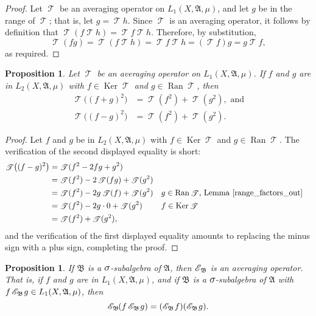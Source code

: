 \documentclass[
twoside=true,
paper=letter,
fontsize=11pt,
pagesize=auto,
leqno,
openany,
headsepline,
overfullrule,
]{scrbook}
\theoremstyle{plain}
\theoremstyle{plain}
\newtheorem{prop}[thm]{Proposition}
\theoremstyle{definition}
\theoremstyle{bfnoteitalic}
\theoremstyle{bfnoteroman}
\newcommand{\sigalg}[1]{\mathfrak{#1}}
\newcommand{\cali}[1]{\mathscr{#1}}
\DeclareMathOperator{\range}{Ran}
\DeclareMathOperator{\kernel}{Ker}
\newcommand{\condexpsub}[2]
{\mathop{\cali{E}\hspace{-1.5pt}}\nolimits_{#2}\hspace{-1pt}#1}
\newcommand{\condexpop}[1]{\mathop{\cali{E}\hspace{-1pt}}\nolimits_{#1}}
\newcommand{\textsigma}{\hbox{\large{$\sigma$}}\kern-1pt}
\newcommand{\sigmaalgebra}{\sigalg{A}}
\newcommand{\sigmaalgebraii}{\sigalg{B}}
\newcommand{\Lone}{L_1(\measurespace, \sigmaalgebra, \measure)}
\newcommand{\Ltwo}{L_2(\measurespace, \sigmaalgebra, \measure)}
\newcommand{\OpT}{\mathop{\cali T}}
\newcommand{\function}{f}
\newcommand{\functionii}{g}
\newcommand{\functioniii}{h}
\newcommand{\measurespace}{X}
\newcommand{\measure}{\mu}
\begin{document}
\begin{proof}
Let $\OpT$ be an averaging operator on $\Lone$, and let $\functionii$ be in the range of $\OpT$; that is, let $\functionii = \OpT \functioniii$. Since $\OpT$ is an averaging operator, it follows by definition that
$ \OpT(\function\OpT \functioniii) = \OpT \function \OpT \functioniii $.  Therefore, by substitution, 
\[
\OpT(\function\functionii) = \OpT(\function\OpT \functioniii) = \OpT \function \OpT \functioniii 
= (\OpT \function)\functionii = \functionii\OpT \function,
\]
as required.
\end{proof}

\begin{prop}\label{averaging_bias_variance}
Let $\OpT$ be an averaging operator on $\Lone$.
If $\function$ and $\functionii$ are in $\Ltwo$ with $\function\in\kernel\OpT$ and $\functionii\in\range \OpT$,  then 
\begin{align*}
\OpT\bigl((\function+\functionii)^2\bigr)
& =
\OpT(\function^2) + \OpT(\functionii^2), \text{ and}
\\
\OpT\bigl((\function-\functionii)^2\bigr)
& =
\OpT(\function^2) + \OpT(\functionii^2).
\end{align*}
\end{prop}

\begin{proof}
Let $\function$ and $\functionii$ be in $\Ltwo$ with $\function\in\kernel\OpT$ and $\functionii\in\range\OpT$.
The verification of the second displayed equality is short:
\begin{align*}
\OpT \bigl( (\function-\functionii)^2 \bigr)
& = \OpT(\function^2 -2\function\functionii +\functionii^2)\\
& = \OpT(\function^2) - 2\OpT(\function\functionii) + \OpT(\functionii^2)\\
& = \OpT(\function^2) - 2\functionii\OpT(\function) +\OpT(\functionii^2)
&& \text{$\functionii\in\range\OpT$, Lemma~\ref{range_factors_out}}\\
& = \OpT(\function^2) - 2\functionii\cdot 0 +\OpT(\functionii^2)
&& \text{$\function\in\kernel\OpT$}\\
& = \OpT(\function^2) + \OpT(\functionii^2),
\end{align*}
and the verification of the first displayed equality amounts to replacing the minus sign with a plus sign, completing the proof.
\end{proof}



\begin{prop}\label{averaging_operator}
If $\sigmaalgebraii$ is a $\textsigma$-subalgebra of $\sigmaalgebra$, then
$\condexpop{\sigmaalgebraii}$ is an averaging operator.  That is, if $\function$ and $\functionii$ are  in $\Lone$, and if $\sigmaalgebraii$ is a $\textsigma$-subalgebra of $\sigmaalgebra$ with
$\function\condexpsub{\functionii}{\sigmaalgebraii}\in\Lone$, then 
\[
\condexpsub{(\function\condexpsub{\functionii}{\sigmaalgebraii})}{\sigmaalgebraii}
=
(\condexpsub{\function}{\sigmaalgebraii})( \condexpsub{\functionii}{\sigmaalgebraii}).
\]
\end{prop}
\end{document}

